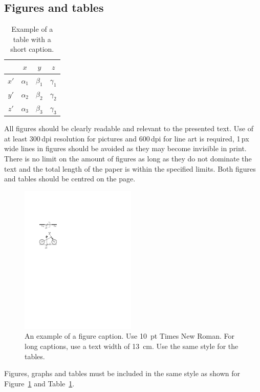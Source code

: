 \documentclass{bmd2016p}
\begin{document}
\subsection{Figures and tables}

\begin{table}[h!]
\begin{center}
\caption{Example of a table with a short caption.} \label{tab:tab1}
\begin{tabular}{|c|ccc|}
\hline
    &  $x$  &  $y$  &  $z$ \\
\hline
$x'$  &  $\alpha_1$ & $\beta_1$ & $\gamma_1$ \\
$y'$  &  $\alpha_2$ & $\beta_2$ & $\gamma_2$ \\
$z'$  &  $\alpha_3$ & $\beta_3$ & $\gamma_3$ \\
\hline
\end{tabular}
\end{center}
\end{table}
All figures should be clearly readable and relevant to the presented text. Use 
of at least 300\,dpi resolution for pictures and 600\,dpi for line art is 
required, 1\,px wide lines in figures should be avoided as they may become 
invisible in print. There is no limit on the amount of figures as long as they 
do not dominate the text and the total length of the paper is within the 
specified limits. Both figures and tables should be centred on the page.

\begin{figure}[h!]
\begin{center}
  \includegraphics[width=55mm]{figure1}
  \caption{An example of a figure caption. Use 10~pt Times New Roman.
           For long captions, use a text width of 13~cm.
           Use the same style for the tables.} \label{fig:fig1}
\end{center}
\end{figure}
Figures, graphs and tables must be included in the same style as shown for 
Figure~\ref{fig:fig1} and Table~\ref{tab:tab1}.
\end{document}
